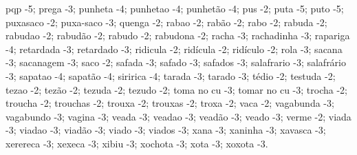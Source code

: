 pqp -5;
prega -3;
punheta -4;
punhetao -4;
punhetão -4;
pus -2;
puta -5;
puto -5;
puxasaco -2;
puxa-saco -3;
quenga -2;
rabao -2;
rabão -2;
rabo -2;
rabuda -2;
rabudao -2;
rabudão -2;
rabudo -2;
rabudona -2;
racha -3;
rachadinha -3;
rapariga -4;
retardada -3;
retardado -3;
ridicula -2;
ridícula -2;
ridículo -2;
rola -3;
sacana -3;
sacanagem -3;
saco -2;
safada -3;
safado -3;
safados -3;
salafrario -3;
salafrário -3;
sapatao -4;
sapatão -4;
siririca -4;
tarada -3;
tarado -3;
tédio -2;
testuda -2;
tezao -2;
tezão -2;
tezuda -2;
tezudo -2;
toma no cu -3;
tomar no cu -3;
trocha -2;
troucha -2;
trouchas -2;
trouxa -2;
trouxas -2;
troxa -2;
vaca -2;
vagabunda -3;
vagabundo -3;
vagina -3;
veada -3;
veadao -3;
veadão -3;
veado -3;
verme -2;
viada -3;
viadao -3;
viadão -3;
viado -3;
viados -3;
xana -3;
xaninha -3;
xavasca -3;
xerereca -3;
xexeca -3;
xibiu -3;
xochota -3;
xota -3;
xoxota -3.